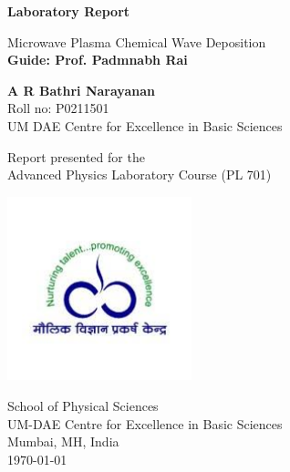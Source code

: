 \begin{titlepage}
	\begin{center}
		\vspace*{1cm}
		
		\Huge
		\textbf{Laboratory Report}
		
		\vspace{0.5cm}
		\LARGE
		Microwave Plasma Chemical Wave Deposition\\
		\vspace{0.5cm}
		\textbf{Guide: Prof. Padmnabh Rai}
		
		\vspace{1.5cm}
		
		\textbf{A R Bathri Narayanan}\\
		Roll no: P0211501\\
		UM DAE Centre for Excellence in Basic Sciences
		
		\vspace{3 cm}
		
		Report presented for the\\
		Advanced Physics Laboratory Course (PL 701)
		
		\vspace{0.8cm}
		
		\includegraphics[width=0.4\textwidth]{cebs.jpg}
		
		\Large
		School of Physical Sciences\\
		UM-DAE Centre for Excellence in Basic Sciences\\
		Mumbai, MH, India\\
		\today
		
	\end{center}
\end{titlepage}